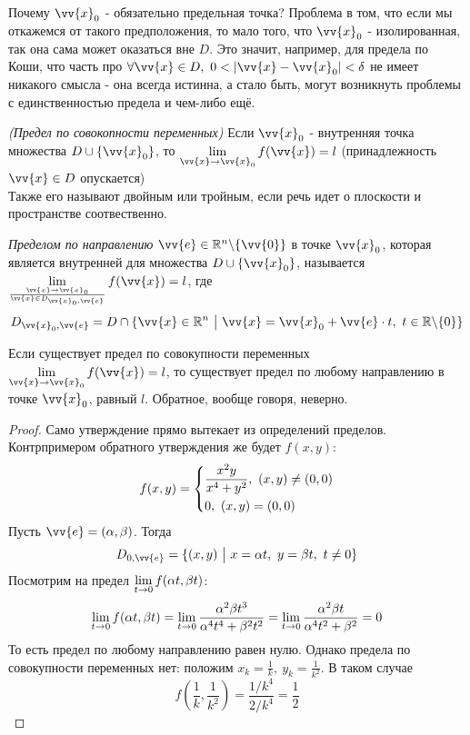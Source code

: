 \begin{note}
	Почему $\vv{x}_0$ - обязательно предельная точка? Проблема в том, что если мы откажемся от такого предположения, то мало того, что $\vv{x}_0$ - изолированная, так она сама может оказаться вне $D$. Это значит, например, для предела по Коши, что часть про $\forall \vv{x} \in D,\ 0 < |\vv{x} - \vv{x}_0| < \delta$ не имеет никакого смысла - она всегда истинна, а стало быть, могут возникнуть проблемы с единственностью предела и чем-либо ещё.
\end{note}

\begin{definition}
	\textit{(Предел по совокопности переменных)}
	Если $\vv{x}_0$ - внутренняя точка множества $D \cup \{\vv{x}_0\}$, то $\liml_{\vv{x} \to \vv{x}_0} f(\vv{x}) = l$ (принадлежность $\vv{x} \in D$ опускается) \\
	Также его называют двойным или тройным, если речь идет о плоскости и пространстве соотвественно.
\end{definition}
\begin{definition}
	\textit{Пределом по направлению} $\vv{e} \in \R^n \bs \{\vv{0}\}$ в точке $\vv{x}_0$, которая является внутренней для множества $D \cup \{\vv{x}_0\}$, называется
	$\liml_{\vv{x} \to \vv{x}_0 \over \vv{x} \in D_{\vv{x}_0, \vv{e}}} f(\vv{x}) = l$, где	\[
	D_{\vv{x}_0, \vv{e}} = D \cap \{\vv{x} \in \R^n \such \vv{x} = \vv{x}_0 + \vv{e} \cdot t,\ t \in \R \bs \{0\}\}
	\]
\end{definition}

\begin{theorem}
	Если существует предел по совокупности переменных $\liml_{\vv{x} \to \vv{x}_0} f(\vv{x}) = l$, то существует предел по любому направлению в точке $\vv{x}_0$, равный $l$. Обратное, вообще говоря, неверно.
\end{theorem}

\begin{proof}
	Само утверждение прямо вытекает из определений  пределов. Контрпримером обратного утверждения же будет $f(x, y)$:
	\[
		f(x, y) = \left\{\begin{aligned}
			&{\frac{x^2 y}{x^4 + y^2},\ (x, y) \neq (0, 0)}
			\\
			&{0,\ (x, y) = (0, 0)}
		\end{aligned}\right.
	\]
	Пусть $\vv{e} = (\alpha, \beta)$. Тогда
	\[
		D_{0, \vv{e}} = \{(x, y) \such x = \alpha t,\ y = \beta t,\ t \neq 0\}
	\]
	Посмотрим на предел $\lim\limits_{t \to 0} f(\alpha t, \beta t)$:
	\[
		\lim\limits_{t \to 0} f(\alpha t, \beta t) = \lim\limits_{t \to 0} \frac{\alpha^2 \beta t^3}{\alpha^4 t^4 + \beta^2 t^2} = \lim\limits_{t \to 0} \frac{\alpha^2 \beta t}{\alpha^4 t^2 + \beta^2} = 0
	\]
	То есть предел по любому направлению равен нулю. Однако предела по совокупности переменных нет: положим $x_k = \frac{1}{k},\ y_k = \frac{1}{k^2}$. В таком случае
	\[
		f\left(\frac{1}{k}, \frac{1}{k^2}\right) = \frac{1 / k^4}{2 / k^4} = \frac{1}{2}
	\]
\end{proof}


